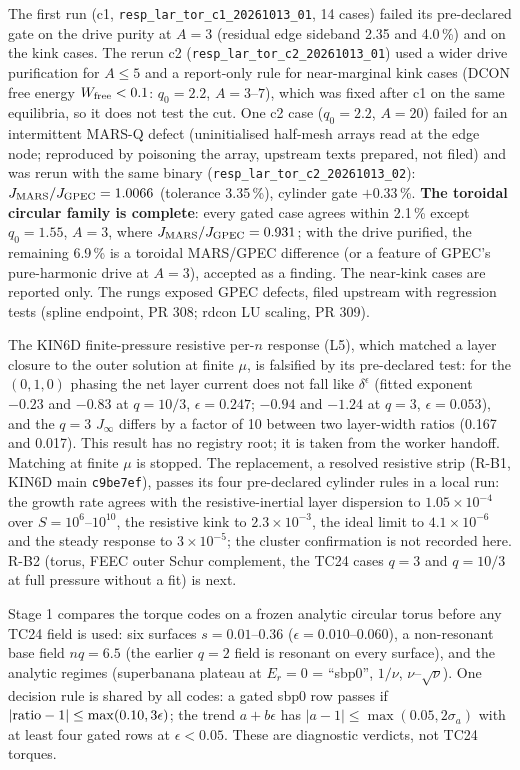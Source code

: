 The first run (c1, \texttt{resp\_lar\_tor\_c1\_20261013\_01}, 14 cases) failed its pre-declared gate on
the drive purity at $A=3$ (residual edge sideband 2.35 and 4.0\,\%) and on the kink cases. The rerun c2
(\texttt{resp\_lar\_tor\_c2\_20261013\_01}) used a wider drive purification for $A\le5$ and a report-only
rule for near-marginal kink cases (DCON free energy $W_{\rm free}<0.1$: $q_0=2.2$, $A=3$--$7$), which was
fixed after c1 on the same equilibria, so it does not test the cut. One c2 case ($q_0=2.2$, $A=20$) failed
for an intermittent MARS-Q defect (uninitialised half-mesh arrays read at the edge node; reproduced by
poisoning the array, upstream texts prepared, not filed) and was rerun with the same binary
(\texttt{resp\_lar\_tor\_c2\_20261013\_02}): $J_{\rm MARS}/J_{\rm GPEC}=1.0066$ (tolerance 3.35\,\%), cylinder
gate $+0.33$\,\%. \textbf{The toroidal circular family is complete}: every gated case agrees within 2.1\,\%
except $q_0=1.55$, $A=3$, where $J_{\rm MARS}/J_{\rm GPEC}=0.931$; with the drive purified, the remaining
6.9\,\% is a toroidal MARS/GPEC difference (or a feature of GPEC's pure-harmonic drive at $A=3$), accepted
as a finding. The near-kink cases are reported only. The rungs exposed GPEC defects, filed upstream with
regression tests (spline endpoint, PR 308; rdcon LU scaling, PR 309).

The KIN6D finite-pressure resistive per-$n$ response (L5), which matched a layer closure to the outer
solution at finite $\mu$, is falsified by its pre-declared test: for the $(0,1,0)$ phasing the net layer
current does not fall like $\delta^{\epsilon}$ (fitted exponent $-0.23$ and $-0.83$ at $q=10/3$, $\epsilon=0.247$;
$-0.94$ and $-1.24$ at $q=3$, $\epsilon=0.053$), and the $q=3$ $J_\infty$ differs by a factor of 10 between
two layer-width ratios (0.167 and 0.017). This result has no registry root; it is taken from the worker
handoff. Matching at finite $\mu$ is stopped. The replacement, a resolved resistive strip (R-B1,
KIN6D main \texttt{c9be7ef}), passes its four pre-declared cylinder rules in a local run: the growth rate
agrees with the resistive-inertial layer dispersion to $1.05\times10^{-4}$ over $S=10^6$--$10^{10}$, the
resistive kink to $2.3\times10^{-3}$, the ideal limit to $4.1\times10^{-6}$ and the steady response to
$3\times10^{-5}$; the cluster confirmation is not recorded here. R-B2 (torus, FEEC outer Schur complement, the
TC24 cases $q=3$ and $q=10/3$ at full pressure without a fit) is next.

\pagebreak
{}\label{sec:ntvs1}
Stage 1 compares the torque codes on a frozen analytic circular torus before any TC24 field is used:
six surfaces $s=0.01$--$0.36$ ($\epsilon=0.010$--$0.060$), a non-resonant base field $nq=6.5$ (the earlier
$q=2$ field is resonant on every surface), and the analytic regimes (superbanana plateau at $E_r=0$ =
``sbp0'', $1/\nu$, $\nu$--$\sqrt\nu$). One decision rule is shared by all codes: a gated sbp0 row passes if
$|{\rm ratio}-1|\le\max(0.10,3\epsilon)$; the trend $a+b\epsilon$ has $|a-1|\le\max(0.05,2\sigma_a)$ with at
least four gated rows at $\epsilon<0.05$. These are diagnostic verdicts, not TC24 torques.


